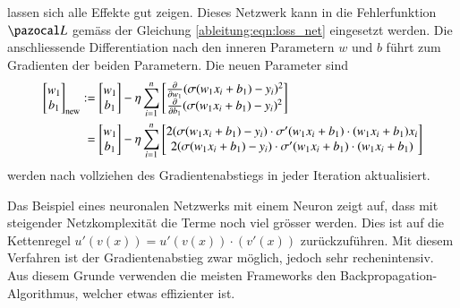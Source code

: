 lassen sich alle Effekte gut zeigen.
Dieses Netzwerk kann in die Fehlerfunktion $\Lb$ gemäss der Gleichung
\eqref{ableitung:eqn:loss_net} eingesetzt werden.
Die anschliessende Differentiation nach den inneren Parametern $w$
und $b$ führt zum Gradienten der beiden Parametern.
Die neuen Parameter sind
\begin{align}
\begin{bmatrix}w_{1}\\b_{1}\end{bmatrix}_{\text{new}}
&:=
{\begin{bmatrix}w_{1}\\b_{1}\end{bmatrix}}
-\eta
\sum_{i=1}^n
{\begin{bmatrix}
{\frac {\partial }{\partial w_{1}}}(\sigma(w_{1}x_{i}+b_{1})-y_{i})^{2}\\
{\frac {\partial }{\partial b_{1}}}(\sigma(w_{1}x_{i}+b_{1})-y_{i})^{2}\end{bmatrix}}
\notag
\\
&\phantom{:}=
{\begin{bmatrix}w_{1}\\b_{1}\end{bmatrix}}
-
\eta
\sum_{i=1}^n
{\begin{bmatrix}2(\sigma(w_{1}x_{i}+b_{1}) - y_i) \cdot \sigma'(w_{1}x_{i}+b_{1}) \cdot (w_{1}x_{i}+b_{1}) x_{i} \\2(\sigma(w_{1}x_{i}+b_{1}) - y_i) \cdot \sigma'(w_{1}x_{i}+b_{1}) \cdot (w_{1}x_{i}+b_{1}) \end{bmatrix}}
\end{align}
werden nach vollziehen des Gradientenabstiegs in jeder Iteration aktualisiert.

Das Beispiel eines neuronalen Netzwerks mit einem Neuron zeigt auf,
dass mit steigender Netzkomplexität die Terme noch viel grösser werden.
Dies ist auf die Kettenregel $u'(v(x)) = u'(v(x)) \cdot (v'(x))$ zurückzuführen.
Mit diesem Verfahren ist der Gradientenabstieg zwar möglich, jedoch sehr rechenintensiv.
Aus diesem Grunde verwenden die meisten Frameworks den Backpropagation-Algorithmus, welcher etwas effizienter ist.
